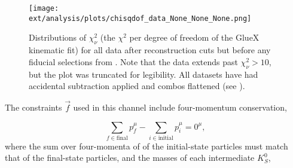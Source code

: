 \begin{figure}
  \begin{center}
      \texttt{[image: ext/analysis/plots/chisqdof\_data\_None\_None\_None.png]}
  \end{center}
  \caption{Distributions of $\chi^2_\nu$ (the $\chi^2$ per degree of freedom of the GlueX kinematic fit) for all data after reconstruction cuts but before any fiducial selections from . Note that the data extends past $\chi^2_\nu > 10$, but the plot was truncated for legibility. All datasets have had accidental subtraction applied and combos flattened (see ).}\label{fig:chisqdof-initial}
\end{figure}


The constraints $\vec{f}$ used in this channel include four-momentum conservation,

\begin{equation}
  \sum_{f\in\text{final}} p^\mu_{f} - \sum_{i\in\text{initial}} p^\mu_{i} = 0^\mu,
  \label{eq:four-momentum-constraint}
\end{equation}
where the sum over four-momenta of of the initial-state particles must match that of the final-state particles, and the masses of each intermediate $K_S^0$,

